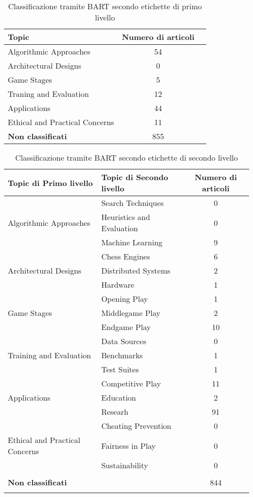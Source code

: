 \begin{table}[H]
    \centering
    \begin{tabular}{l|cc|}
        \hline
        \textbf{Topic} & \textbf{Numero di articoli} \\
        \hline
        Algorithmic Approaches & 54 \\
        Architectural Designs & 0 \\
        Game Stages & 5 \\
        Traning and Evaluation & 12 \\
        Applications & 44 \\
        Ethical and Practical Concerns & 11 \\
        \hline
        \textbf{Non classificati} & 855 \\
    \end{tabular}
    \caption{Classificazione tramite BART secondo etichette di primo livello}
\end{table}
\begin{table}[H]
    \centering
    \begin{tabular}{l|l|c}
        \hline
        \textbf{Topic di Primo livello} & \textbf{Topic di Secondo livello} & \textbf{Numero di articoli} \\
        \hline
        & Search Techniques & 0 \\
        Algorithmic Approaches & Heuristics and Evaluation & 0 \\
        & Machine Learning & 9 \\
        \hline
        & Chess Engines & 6 \\
        Architectural Designs & Distributed Systems & 2 \\
        & Hardware & 1 \\
        \hline
        & Opening Play & 1 \\
        Game Stages & Middlegame Play & 2 \\
        & Endgame Play & 10 \\
        \hline
        & Data Sources & 0 \\
        Training and Evaluation & Benchmarks & 1 \\
        & Test Suites & 1 \\
        \hline
        & Competitive Play & 11 \\
        Applications & Education & 2 \\
        & Researh & 91 \\
        \hline
        & Cheating Prevention & 0 \\
        Ethical and Practical Concerns & Fairness in Play & 0 \\
        & Sustainability & 0 \\
        \hline
        & & \\
        \textbf{Non classificati} & & 844 \\
        & & \\
    \end{tabular}
    \caption{Classificazione tramite BART secondo etichette di secondo livello}
\end{table}
